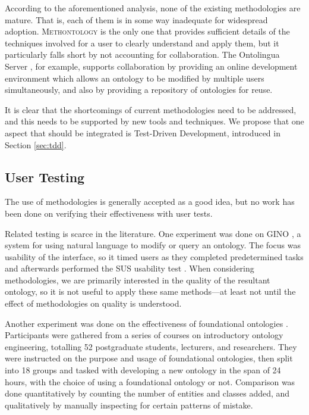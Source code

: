 \documentclass{sig-alternate}
\begin{document}
According to the aforementioned analysis, none of the existing methodologies are mature.  That is, each of them is in some way inadequate for widespread adoption.  \textsc{Methontology} is the only one that provides sufficient details of the techniques involved for a user to clearly understand and apply them, but it particularly falls short by not accounting for collaboration.  The Ontolingua Server \cite{Farquhar:Ontolingua}, for example, supports collaboration by providing an online development environment which allows an ontology to be modified by multiple users simultaneously, and also by providing a repository of ontologies for reuse.

It is clear that the shortcomings of current methodologies need to be addressed, and this needs to be supported by new tools and techniques.  We propose that one aspect that should be integrated is Test-Driven Development, introduced in Section \ref{sec:tdd}.

\subsection{User Testing}

The use of methodologies is generally accepted as a good idea, but no work has been done on verifying their effectiveness with user tests.

Related testing is scarce in the literature.  One experiment was done on GINO \cite{Bernstein:GINO}, a system for using natural language to modify or query an ontology.  The focus was usability of the interface, so it timed users as they completed predetermined tasks and afterwards performed the SUS usability test \cite{Brooke:SUS}.  When considering methodologies, we are primarily interested in the quality of the resultant ontology, so it is not useful to apply these same methods---at least not until the effect of methodologies on quality is understood.

Another experiment was done on the effectiveness of foundational ontologies \cite{Keet:Foundational}.  Participants were gathered from a series of courses on introductory ontology engineering, totalling 52 postgraduate students, lecturers, and researchers.  They were instructed on the purpose and usage of foundational ontologies, then split into 18 groups and tasked with developing a new ontology in the span of 24 hours, with the choice of using a foundational ontology or not.  Comparison was done quantitatively by counting the number of entities and classes added, and qualitatively by manually inspecting for certain patterns of mistake.
\end{document}
